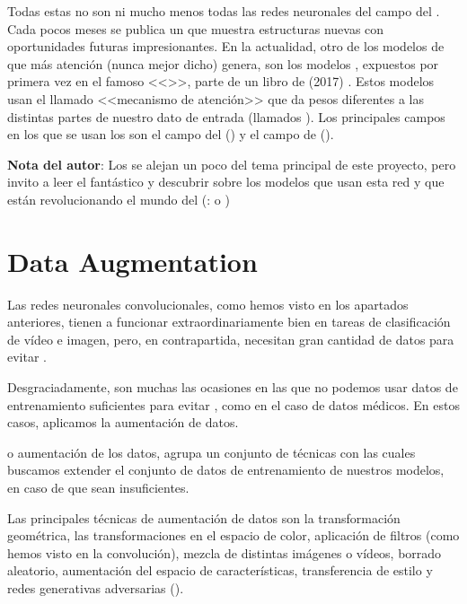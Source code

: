 Todas estas no son ni mucho menos todas las redes neuronales del campo del . Cada pocos meses se publica un  que muestra estructuras nuevas con oportunidades futuras impresionantes. En la actualidad, otro de los modelos de  que más atención (nunca mejor dicho) genera, son los modelos , expuestos por primera vez en el famoso  <<>>, parte de un libro de (2017) . Estos modelos usan el llamado <<mecanismo de atención>> que da pesos diferentes a las distintas partes de nuestro dato de entrada (llamados ). Los principales campos en los que se usan los  son el campo del  () y el campo de  ().

\textbf{Nota del autor}: Los  se alejan un poco del tema principal de este proyecto, pero invito a leer el fantástico  y descubrir sobre los modelos que usan esta red y que están revolucionando el mundo del  (\pe:  o )

\section{Data Augmentation}

Las redes neuronales convolucionales, como hemos visto en los apartados anteriores, tienen a funcionar
extraordinariamente bien en tareas de clasificación de vídeo e imagen, pero, en contrapartida, necesitan gran cantidad de datos para evitar  .

Desgraciadamente, son muchas las ocasiones en las que no podemos usar datos de entrenamiento suficientes para evitar , como en el caso de datos médicos. En estos casos, aplicamos la aumentación de datos.

 o aumentación de los datos, agrupa un conjunto de técnicas con las cuales buscamos extender el conjunto de datos de entrenamiento de nuestros modelos, en caso de que sean insuficientes.

Las principales técnicas de aumentación de datos son la transformación geométrica, las transformaciones en el espacio de color, aplicación de filtros  (como hemos visto en la convolución), mezcla de distintas imágenes o vídeos, borrado aleatorio, aumentación del espacio de características, transferencia de estilo y redes generativas adversarias ().


